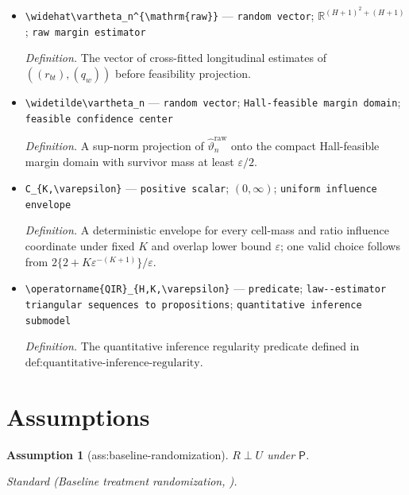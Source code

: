 \documentclass{article}
\newtheorem{assumption}{Assumption}
\begin{document}
\begin{itemize}
  \par\smallskip\noindent\emph{Definition.} \(\varphi_{q_w}=(\varphi_{0,F_w^0}-q_w\varphi_{0,F_S^0})/\sigma_0\).
  \item \texttt{\textbackslash{}\allowbreak{}widehat\textbackslash{}\allowbreak{}vartheta\_\allowbreak{}n\textasciicircum{}\{\textbackslash{}\allowbreak{}mathrm\{raw\}\allowbreak{}\}\allowbreak{}} --- \texttt{random vector}; \(\mathbb R^{(H+1)^2+(H+1)}\); \texttt{raw margin estimator}
  \par\smallskip\noindent\emph{Definition.} The vector of cross-fitted longitudinal estimates of \(((r_{bt}),(q_w))\) before feasibility projection.
  \item \texttt{\textbackslash{}\allowbreak{}widetilde\textbackslash{}\allowbreak{}vartheta\_\allowbreak{}n} --- \texttt{random vector}; \texttt{Hall-\allowbreak{}feasible margin domain}; \texttt{feasible confidence center}
  \par\smallskip\noindent\emph{Definition.} A sup-norm projection of \(\widehat\vartheta_n^{\mathrm{raw}}\) onto the compact Hall-feasible margin domain with survivor mass at least \(\varepsilon/2\).
  \item \texttt{C\_\allowbreak{}\{K,\allowbreak{}\textbackslash{}\allowbreak{}varepsilon\}\allowbreak{}} --- \texttt{positive scalar}; \((0,\infty)\); \texttt{uniform influence envelope}
  \par\smallskip\noindent\emph{Definition.} A deterministic envelope for every cell-mass and ratio influence coordinate under fixed \(K\) and overlap lower bound \(\varepsilon\); one valid choice follows from \(2\{2+K\varepsilon^{-(K+1)}\}/\varepsilon\).
  \item \texttt{\textbackslash{}\allowbreak{}operatorname\{QIR\}\allowbreak{}\_\allowbreak{}\{H,\allowbreak{}K,\allowbreak{}\textbackslash{}\allowbreak{}varepsilon\}\allowbreak{}} --- \texttt{predicate}; \texttt{law-\allowbreak{}-\allowbreak{}estimator triangular sequences to propositions}; \texttt{quantitative inference submodel}
  \par\smallskip\noindent\emph{Definition.} The quantitative inference regularity predicate defined in \(\text{def:quantitative-inference-regularity}\).
\end{itemize}

\section{Assumptions}

\begin{assumption}[ass:baseline-randomization]\label{ass:baseline-randomization}
\(R\perp U\) under \(\mathsf P\).
\par\smallskip\noindent\emph{Standard} (Baseline treatment randomization, \cite{JanvinRyalenSarvetStensrud2025}).
\end{assumption}
\end{document}
